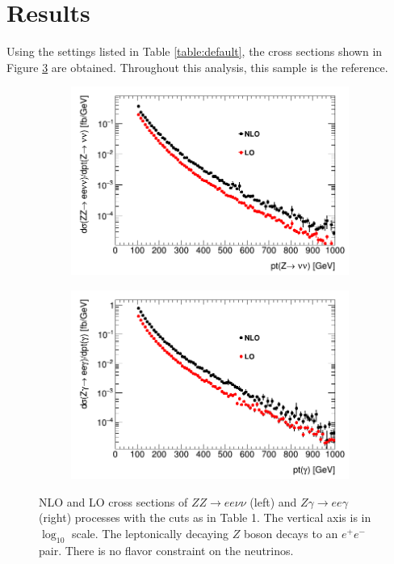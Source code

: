 \documentclass[11pt,a4paper]{report}
\begin{document}
\section{Results}
Using the settings listed in Table \ref{table:default}, the cross sections shown in Figure \ref{xsecs} are obtained. Throughout this analysis, this sample is the reference.
\begin{figure}[H]
\centering
	\begin{subfigure}{0.49\textwidth}
		\includegraphics[width=\linewidth]{ZZ_xsec.png}
		\caption{}
		\label{subfig:ZeeZvv}
	\end{subfigure}	
	\begin{subfigure}{0.49\textwidth}
		\includegraphics[width=\linewidth]{Zg_xsec.png}
		\caption{}
		\label{subfig:Zeeg}	
	\end{subfigure}
	\caption{NLO and LO cross sections of $ZZ\to ee\nu\nu$ (left) and $Z\gamma\to ee\gamma$ (right) processes with the cuts as in Table 1. The vertical axis is in $\log_{10}$ scale. The leptonically decaying $Z$ boson decays to an $e^+e^-$ pair. There is no flavor constraint on the neutrinos.}
	\label{xsecs}
\end{figure}
\end{document}
